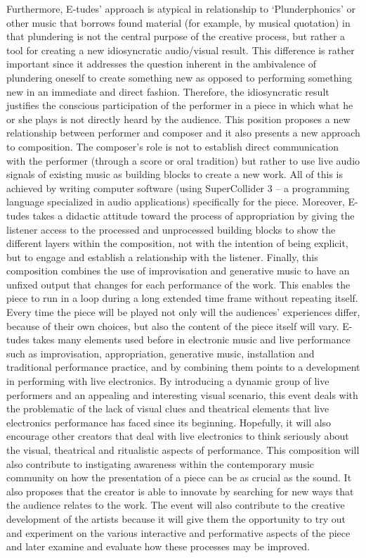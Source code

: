 	Furthermore, E-tudes’ approach is atypical in relationship to ‘Plunderphonics’ or other music that borrows found material (for example, by musical quotation) in that plundering is not the central purpose of the creative process, but rather a tool for creating a new idiosyncratic audio/visual result. This difference is rather important since it addresses the question inherent in the ambivalence of plundering oneself to create something new as opposed to performing something new in an immediate and direct fashion. Therefore, the idiosyncratic result justifies the conscious participation of the performer in a piece in which what he or she plays is not directly heard by the audience.  This position proposes a new relationship between performer and composer and it also presents a new approach to composition. The composer’s role is not to establish direct communication with the performer (through a score or oral tradition) but rather to use live audio signals of existing music as building blocks to create a new work. All of this is achieved by writing computer software (using SuperCollider 3 – a programming language specialized in audio applications) specifically for the piece. Moreover, E-tudes takes a didactic attitude toward the process of appropriation by giving the listener access to the processed and unprocessed building blocks to show the different layers within the composition, not with the intention of being explicit, but to engage and establish a relationship with the listener. Finally, this composition combines the use of improvisation and generative music to have an unfixed output that changes for each performance of the work. This enables the piece to run in a loop during a long extended time frame without repeating itself. Every time the piece will be played not only will the audiences’ experiences differ, because of their own choices, but also the content of the piece itself will vary.
	E-tudes takes many elements used before in electronic music and live performance such as improvisation, appropriation, generative music, installation and traditional performance practice, and by combining them points to a development in performing with live electronics. By introducing a dynamic group of live performers and an appealing and interesting visual scenario, this event deals with the problematic of the lack of visual clues and theatrical elements that live electronics performance has faced since its beginning. Hopefully, it will also encourage other creators that deal with live electronics to think seriously about the visual, theatrical and ritualistic aspects of performance. This composition will also contribute to instigating awareness within the contemporary music community on how the presentation of a piece can be as crucial as the sound. It also proposes that the creator is able to innovate by searching for new ways that the audience relates to the work. The event will also contribute to the creative development of the artists because it will give them the opportunity to try out and experiment on the various interactive and performative aspects of the piece and later examine and evaluate how these processes may be improved.

